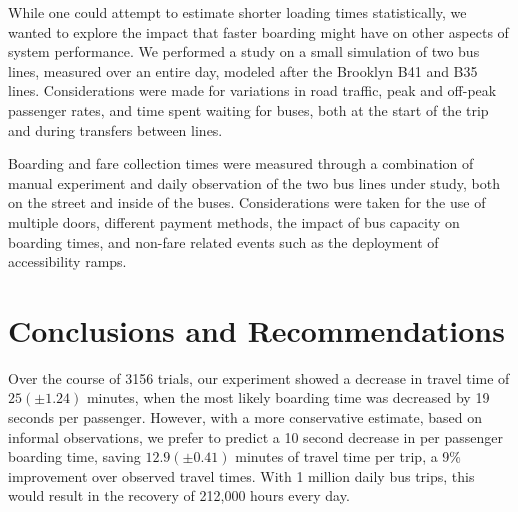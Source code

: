 \documentclass[12pt]{article}
\theoremstyle{definition}
\begin{document}
While one could attempt to estimate shorter loading times statistically, we
wanted to explore the impact that faster boarding might have on other aspects
of system performance. We performed a study on a small simulation of two bus
lines, measured over an entire day, modeled after the Brooklyn B41 and B35
lines. Considerations were made for variations in road traffic, peak and
off-peak passenger rates, and time spent waiting for buses, both at the start
of the trip and during transfers between lines.

Boarding and fare collection times were measured through a combination of
manual experiment and daily observation of the two bus lines under study, both
on the street and inside of the buses. Considerations were taken for the use
of multiple doors, different payment methods, the impact of bus capacity on
boarding times, and non-fare related events such as the deployment of
accessibility ramps.

\section{Conclusions and Recommendations}

Over the course of 3156 trials, our experiment showed a decrease
in travel time of $25 \left(\pm 1.24\right)$ minutes, when the most likely
boarding
time was decreased by 19 seconds per passenger. However, with a more
conservative estimate, based on informal observations, we prefer to predict a
10 second decrease in per passenger boarding time, saving
$12.9 \left(\pm0.41\right)$ minutes of travel time per trip, a 9\%
improvement over observed travel times. With 1 million daily bus trips, this
would result in the recovery of 212,000 hours every day.
\end{document}
